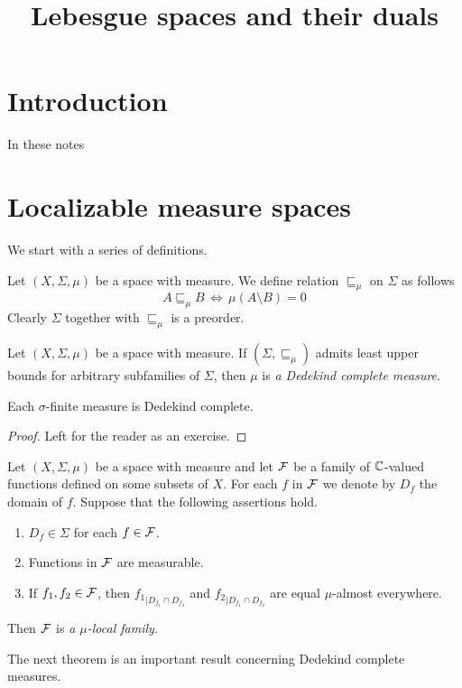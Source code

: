 



\title{Lebesgue spaces and their duals}
\date{}
\maketitle


\section{Introduction}
\noindent
In these notes


\section{Localizable measure spaces}
\noindent
We start with a series of definitions.

\begin{definition}
  Let $(X,\Sigma,\mu)$ be a space with measure. We define relation $\sqsubseteq_{\mu}$ on $\Sigma$ as follows
  $$A \sqsubseteq_{\mu} B\,\Leftrightarrow\,\mu(A\setminus B) = 0$$
  Clearly $\Sigma$ together with $\sqsubseteq_{\mu}$ is a preorder.
\end{definition}

\begin{definition}
  Let $(X,\Sigma,\mu)$ be a space with measure. If $\left(\Sigma, \sqsubseteq_{\mu}\right)$ admits least upper bounds for arbitrary subfamilies of $\Sigma$, then $\mu$ is \textit{a Dedekind complete measure}.
\end{definition}

\begin{proposition}\label{proposition:sigma_finite_measure_spaces_are_Dedekind_complete}
Each $\sigma$-finite measure is Dedekind complete.
\end{proposition}
\begin{proof}
  Left for the reader as an exercise.
\end{proof}

\begin{definition}
  Let $(X,\Sigma,\mu)$ be a space with measure and let ${\mathcal F}$ be a family of ${\mathbb C}$-valued functions defined on some subsets of $X$. For each $f$ in ${\mathcal F}$ we denote by $D_f$ the domain of $f$. Suppose that the following assertions hold.
  \begin{enumerate}[label=\textbf{(\arabic*)}, leftmargin=*]
    \item $D_f \in \Sigma$ for each $f\in {\mathcal F}$.
    \item Functions in ${\mathcal F}$ are measurable.
    \item If $f_1,f_2 \in {\mathcal F}$, then ${f_1}_{\mid D_{f_1}\cap D_{f_2}}$ and ${f_2}_{\mid D_{f_1}\cap D_{f_2}}$ are equal $\mu$-almost everywhere.
  \end{enumerate}
  Then ${\mathcal F}$ is \textit{a $\mu$-local family}.
\end{definition}
\noindent
The next theorem is an important result concerning Dedekind complete measures.

